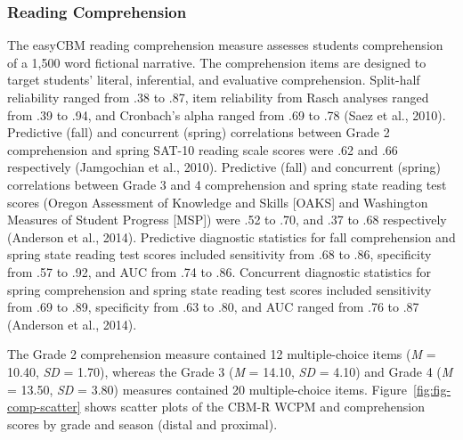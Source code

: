 \documentclass[
  english,
  man, fleqn, noextraspace]{apa6}
\begin{document}
\hypertarget{reading-comprehension}{%
\subsubsection{Reading Comprehension}\label{reading-comprehension}}

The easyCBM reading comprehension measure assesses students comprehension of a 1,500 word fictional narrative. The comprehension items are designed to target students' literal, inferential, and evaluative comprehension. Split-half reliability ranged from .38 to .87, item reliability from Rasch analyses ranged from .39 to .94, and Cronbach's alpha ranged from .69 to .78 (Saez et al., 2010). Predictive (fall) and concurrent (spring) correlations between Grade 2 comprehension and spring SAT-10 reading scale scores were .62 and .66 respectively (Jamgochian et al., 2010). Predictive (fall) and concurrent (spring) correlations between Grade 3 and 4 comprehension and spring state reading test scores (Oregon Assessment of Knowledge and Skills {[}OAKS{]} and Washington Measures of Student Progress {[}MSP{]}) were .52 to .70, and .37 to .68 respectively (Anderson et al., 2014). Predictive diagnostic statistics for fall comprehension and spring state reading test scores included sensitivity from .68 to .86, specificity from .57 to .92, and AUC from .74 to .86. Concurrent diagnostic statistics for spring comprehension and spring state reading test scores included sensitivity from .69 to .89, specificity from .63 to .80, and AUC ranged from .76 to .87 (Anderson et al., 2014).

The Grade 2 comprehension measure contained 12 multiple-choice items (\emph{M} = 10.40, \emph{SD} = 1.70), whereas the Grade 3 (\emph{M} = 14.10, \emph{SD} = 4.10) and Grade 4 (\emph{M} = 13.50, \emph{SD} = 3.80) measures contained 20 multiple-choice items. Figure~\ref{fig:fig-comp-scatter} shows scatter plots of the CBM-R WCPM and comprehension scores by grade and season (distal and proximal).
\end{document}
